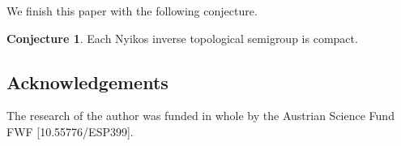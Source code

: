 \documentclass[12pt, twoside, leqno]{article}
\theoremstyle{definition}
\newtheorem{conjecture}[theorem]{Conjecture}
\numberwithin{equation}{section}
\begin{document}
We finish this paper with the following conjecture.

\begin{conjecture}
Each Nyikos inverse topological semigroup is compact.    
\end{conjecture}










\subsection*{Acknowledgements}
The research of the author was funded in whole by the Austrian Science Fund FWF [10.55776/ESP399].
\end{document}
